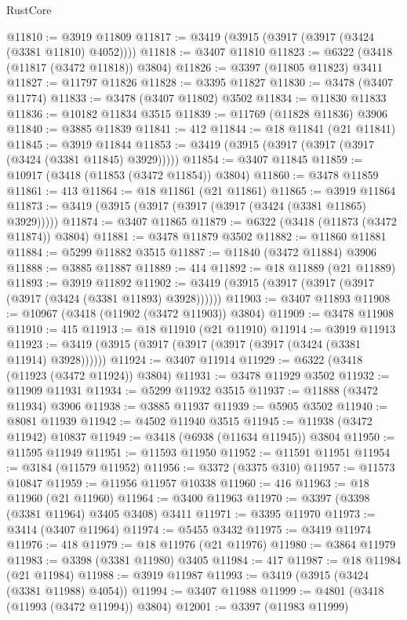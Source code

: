 \begin{lexlean}{RustCore}
\begin{coremodule}
@11810 := @3919 @11809
@11817 := @3419 (@3915 (@3917 (@3917 (@3424 (@3381 @11810) @4052))))
@11818 := @3407 @11810
@11823 := @6322 (@3418 (@11817 (@3472 @11818)) @3804)
@11826 := @3397 (@11805 @11823) @3411
@11827 := @11797 @11826
@11828 := @3395 @11827
@11830 := @3478 (@3407 @11774)
@11833 := @3478 (@3407 @11802) @3502
@11834 := @11830 @11833
@11836 := @10182 @11834 @3515
@11839 := @11769 (@11828 @11836) @3906
@11840 := @3885 @11839
@11841 := 412
@11844 := @18 @11841 (@21 @11841)
@11845 := @3919 @11844
@11853 := @3419 (@3915 (@3917 (@3917 (@3917 (@3424 (@3381 @11845) @3929)))))
@11854 := @3407 @11845
@11859 := @10917 (@3418 (@11853 (@3472 @11854)) @3804)
@11860 := @3478 @11859
@11861 := 413
@11864 := @18 @11861 (@21 @11861)
@11865 := @3919 @11864
@11873 := @3419 (@3915 (@3917 (@3917 (@3917 (@3424 (@3381 @11865) @3929)))))
@11874 := @3407 @11865
@11879 := @6322 (@3418 (@11873 (@3472 @11874)) @3804)
@11881 := @3478 @11879 @3502
@11882 := @11860 @11881
@11884 := @5299 @11882 @3515
@11887 := @11840 (@3472 @11884) @3906
@11888 := @3885 @11887
@11889 := 414
@11892 := @18 @11889 (@21 @11889)
@11893 := @3919 @11892
@11902 := @3419 (@3915 (@3917 (@3917 (@3917 (@3917 (@3424 (@3381 @11893) @3928))))))
@11903 := @3407 @11893
@11908 := @10967 (@3418 (@11902 (@3472 @11903)) @3804)
@11909 := @3478 @11908
@11910 := 415
@11913 := @18 @11910 (@21 @11910)
@11914 := @3919 @11913
@11923 := @3419 (@3915 (@3917 (@3917 (@3917 (@3917 (@3424 (@3381 @11914) @3928))))))
@11924 := @3407 @11914
@11929 := @6322 (@3418 (@11923 (@3472 @11924)) @3804)
@11931 := @3478 @11929 @3502
@11932 := @11909 @11931
@11934 := @5299 @11932 @3515
@11937 := @11888 (@3472 @11934) @3906
@11938 := @3885 @11937
@11939 := @5905 @3502
@11940 := @8081 @11939
@11942 := @4502 @11940 @3515
@11945 := @11938 (@3472 @11942) @10837
@11949 := @3418 (@6938 (@11634 @11945)) @3804
@11950 := @11595 @11949
@11951 := @11593 @11950
@11952 := @11591 @11951
@11954 := @3184 (@11579 @11952)
@11956 := @3372 (@3375 @310)
@11957 := @11573 @10847
@11959 := @11956 @11957 @10338
@11960 := 416
@11963 := @18 @11960 (@21 @11960)
@11964 := @3400 @11963
@11970 := @3397 (@3398 (@3381 @11964) @3405 @3408) @3411
@11971 := @3395 @11970
@11973 := @3414 (@3407 @11964)
@11974 := @5455 @3432
@11975 := @3419 @11974
@11976 := 418
@11979 := @18 @11976 (@21 @11976)
@11980 := @3864 @11979
@11983 := @3398 (@3381 @11980) @3405
@11984 := 417
@11987 := @18 @11984 (@21 @11984)
@11988 := @3919 @11987
@11993 := @3419 (@3915 (@3424 (@3381 @11988) @4054))
@11994 := @3407 @11988
@11999 := @4801 (@3418 (@11993 (@3472 @11994)) @3804)
@12001 := @3397 (@11983 @11999)

\end{coremodule}
\end{lexlean}
